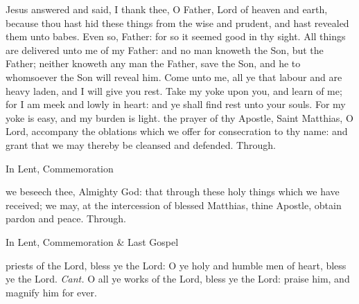  Jesus answered and said, I thank thee, O Father, Lord of heaven and earth, because thou hast hid these things from the wise and prudent, and hast revealed them unto babes. Even so, Father: for so it seemed good in thy sight. All things are delivered unto me of my Father: and no man knoweth the Son, but the Father; neither knoweth any man the Father, save the Son, and he to whomsoever the Son will reveal him. Come unto me, all ye that labour and are heavy laden, and I will give you rest. Take my yoke upon you, and learn of me; for I am meek and lowly in heart: and ye shall find rest unto your souls. For my yoke is easy, and my burden is light.
\secret
{} the prayer of thy Apostle, Saint Matthias, O Lord, accompany the oblations which we offer for consecration to thy name: and grant that we may thereby be cleansed and defended. Through.
\begin{rubric}
    In Lent, Commemoration %
\end{rubric}
\postcommunion
{} we beseech thee, Almighty God: that through these holy things which we have received; we may, at the intercession of blessed Matthias, thine Apostle, obtain pardon and peace. Through.
\begin{rubric}
    In Lent, Commemoration \& Last Gospel 
\end{rubric}


\clearpage
{}

\introit
{} priests of the Lord, bless ye the Lord: O ye holy and humble
men of heart, bless ye the Lord. \textit{Cant.} O all ye works of the Lord, bless ye the Lord: praise him, and magnify him for ever.

